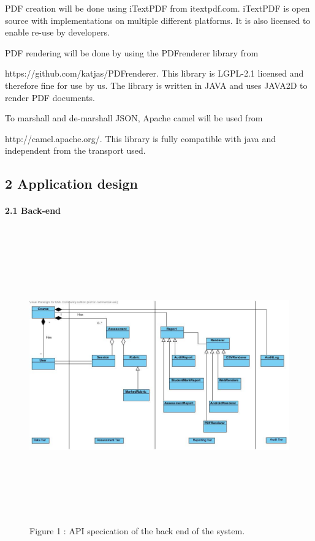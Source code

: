 \documentclass{article}
\begin{document}
 PDF creation will be done using iTextPDF from itextpdf.com. iTextPDF is open source with implementations on multiple different platforms. It is also licensed to enable re-use by developers.



PDF rendering will be done by using the PDFrenderer library from 

https://github.com/katjas/PDFrenderer. This library is LGPL-2.1 licensed and therefore fine for use by us. The library is written in JAVA and uses JAVA2D to render PDF documents.



To marshall and de-marshall JSON, Apache camel will be used from 

http://camel.apache.org/. This library is fully compatible with java and independent from the transport used.




\subsection{2  Application design}

 


\paragraph{2.1  Back-end}




\begin{figure}[ht!]
		\centering
  		\includegraphics[width=5in, height=5in]{./Diagrams/2.1.2/BackEndAPI.jpg}
  		Figure 1 : API specication of the back end of the system.
\end{figure}
\end{document}
